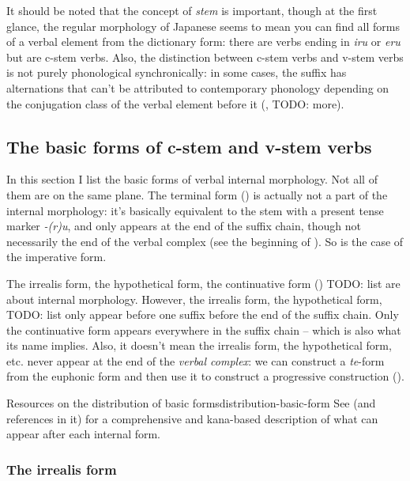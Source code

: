 \documentclass[UTF8, a4paper, oneside, scheme=plain]{ctexrep}
\newcommand*{\citesec}[1]{\S~{#1}}
\newcommand*{\term}[1]{\emph{#1}}
\newcommand{\corpus}[1]{\emph{#1}}
\begin{document}
It should be noted that the concept of \term{stem} is important,
though at the first glance, the regular morphology of Japanese seems to 
mean you can find all forms of a verbal element from the dictionary form:
there are verbs ending in \corpus{iru} or \corpus{eru} but are c-stem verbs.
Also, the distinction between c-stem verbs and v-stem verbs is not purely phonological synchronically:
in some cases, the suffix has alternations that can't be attributed to contemporary phonology 
depending on the conjugation class of the verbal element before it
(, TODO: more).

\subsection{The basic forms of c-stem and v-stem verbs}\label{sec:internal-forms}

In this section I list the basic forms of verbal internal morphology.
Not all of them are on the same plane.
The terminal form () is actually not a part of the internal morphology:
it's basically equivalent to the stem with a present tense marker \corpus{-(r)u},
and only appears at the end of the suffix chain,
though not necessarily the end of the verbal complex
(see the beginning of ).
So is the case of the imperative form.

The irrealis form, the hypothetical form, 
the continuative form () TODO: list
are about internal morphology.
However, the irrealis form, the hypothetical form, TODO: list 
only appear before one suffix before the end of the suffix chain.
Only the continuative form appears everywhere in the suffix chain -- 
which is also what its name implies.
Also, it doesn't mean the irrealis form, the hypothetical form, etc. 
never appear at the end of the \emph{verbal complex}:
we can construct a \corpus{te}-form from the euphonic form 
and then use it to construct a progressive construction (). 

\begin{infobox}{Resources on the distribution of basic forms}{distribution-basic-form}
    See \citet[\citesec{3.2.4}]{gu2004} (and references in it) 
    for a comprehensive and kana-based description of 
    what can appear after each internal form.
\end{infobox}

\subsubsection{The irrealis form}\label{sec:irrealis-form}
\end{document}
